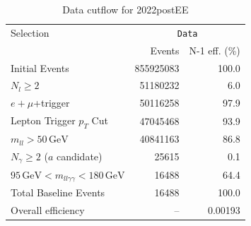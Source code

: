 \begin{table}[htbp]
\centering
\caption{Data cutflow for 2022postEE}
\label{tab:cutflow-data-2022postee}
\footnotesize
\begin{tabular}{lrr}
\hline
Selection & \multicolumn{2}{c}{\texttt{Data}} \\
 & Events & N-1 eff. (\%) \\
\hline
Initial Events & 855925083 & 100.0 \\
$N_{l}\geq 2$ & 51180232 & 6.0 \\
$e+\mu$+trigger & 50116258 & 97.9 \\
Lepton Trigger $p_T$ Cut & 47045468 & 93.9 \\
$m_{ll} > 50\,\mathrm{GeV}$ & 40841163 & 86.8 \\
$N_{\gamma}\geq 2$ ($a$ candidate) & 25615 & 0.1 \\
$95\,\mathrm{GeV} < m_{ll\gamma\gamma} < 180\,\mathrm{GeV}$ & 16488 & 64.4 \\
Total Baseline Events & 16488 & 100.0 \\
\hline
Overall efficiency & -- & 0.00193 \\
\hline
\end{tabular}
\end{table}

